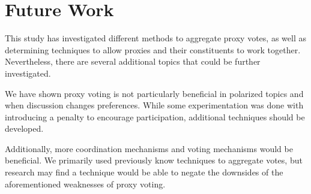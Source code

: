 \section{Future Work}\label{sec:future-work}
This study has investigated different methods to aggregate proxy votes, as well as
determining techniques to allow proxies and their constituents to work together.
Nevertheless, there are several additional topics that could be further investigated.

We have shown proxy voting is not particularly beneficial in polarized topics and
when discussion changes preferences.
While some experimentation was done with introducing a penalty to encourage
participation, additional techniques should be developed.

Additionally, more coordination mechanisms and voting mechanisms would be beneficial.
We primarily used previously know techniques to aggregate votes, but research may
find a technique would be able to negate the downsides of the aforementioned
weaknesses of proxy voting.
